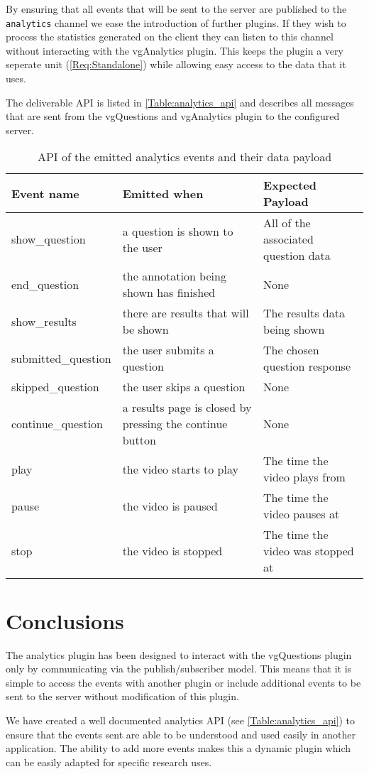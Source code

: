 By ensuring that all events that will be sent to the server are published to the \lstinline|analytics| channel we ease the introduction of further plugins. If they wish to process the statistics generated on the client they  can listen to this channel without interacting with the vgAnalytics plugin. This keeps the plugin a very seperate unit (\cref{Req:Standalone}) while allowing easy access to the data that it uses.

The deliverable API is listed in \autoref{Table:analytics_api} and describes all messages that are sent from the vgQuestions and vgAnalytics plugin to the configured server.

\begin{table}[h]
\caption{\label{Table:analytics_api}API of the emitted analytics events and their data payload}
\begin{tabular}{p{3.2cm} p{6cm} p{4cm}}
\textbf{Event name} & \textbf{Emitted when} & \textbf{Expected Payload} \\
\hline
show\_question & a question is shown to the user & All of the associated question data \\
\hline
end\_question & the annotation being shown has finished & None \\
\hline
show\_results & there are results that will be shown & The results data being shown \\
\hline
submitted\_question & the user submits a question & The chosen question response \\
\hline
skipped\_question & the user skips a question & None \\
\hline
continue\_question & a results page is closed by pressing the continue button & None \\
\hline
play & the video starts to play & The time the video plays from \\
\hline
pause & the video is paused & The time the video pauses at \\
\hline
stop & the video is stopped & The time the video was stopped at \\
\end{tabular}
\end{table}

\section{Conclusions}

The analytics plugin has been designed to interact with the \gls{vgQuestions} plugin only by communicating via the publish/subscriber model. This means that it is simple to access the events with another plugin or include additional events to be sent to the server without modification of this plugin.

We have created a well documented analytics \gls{API} (see \autoref{Table:analytics_api}) to ensure that the events sent are able to be understood and used easily in another application. The ability to add more events makes this a dynamic plugin which can be easily adapted for specific research uses.
